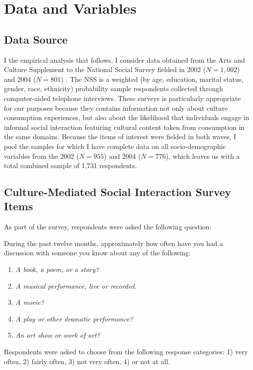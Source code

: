 \section{Data and Variables}
\subsection{Data Source}
I the empirical analysis that follows, I consider data obtained from the Arts and Culture Supplement to the National Social Survey fielded in 2002 ($N=1,002$) and 2004 ($N=801$) \citep{NSS2002, NSS2004}.  The NSS is a weighted (by age, education, marital status, gender, race, ethnicity) probability sample respondents collected through computer-aided telephone interviews.   These surveys is particularly appropriate for our purposes because they contains information not only about culture consumption experiences, but also about the likelihood that individuals engage in informal social interaction featuring cultural content taken from consumption in the same domains.  Because the items of interest were fielded in both waves, I pool the samples for which I have complete data on all socio-demographic variables from the 2002 ($N=955$) and 2004 ($N=776$), which leaves us with a total combined sample of 1,731 respondents.

\subsection{Culture-Mediated Social Interaction Survey Items}
As part of the survey, respondents were asked the following question:

During the past twelve months, approximately how often have you had a discussion with someone you know about any of the following:
\begin{enumerate}
\item  \emph{A book, a poem, or a story?}
\item  \emph{A musical performance, live or recorded.}
\item  \emph{A movie?}
\item  \emph{A play or other dramatic performance?}
\item  \emph{An art show or work of art?}
\end{enumerate}

Respondents were asked to choose from the following response categories: 1) very often, 2) fairly often, 3) not very often, 4) or not at all. 
 
